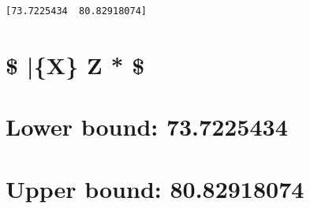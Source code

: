\documentclass[11pt]{article}
\begin{document}
    \begin{Verbatim}[commandchars=\\\{\}]
[73.7225434  80.82918074]

    \end{Verbatim}

    \hypertarget{x-z}{%
\section{\texorpdfstring{\$ \bar\{X\} \pm Z * \frac{ \sigma} {}
\$}{\$ \{X\} Z *  \$}}\label{x-z}}

\hypertarget{lower-bound-73.7225434}{%
\section{Lower bound: 73.7225434}\label{lower-bound-73.7225434}}

\hypertarget{upper-bound-80.82918074}{%
\section{Upper bound: 80.82918074}\label{upper-bound-80.82918074}}


    
    
    
    
\end{document}

